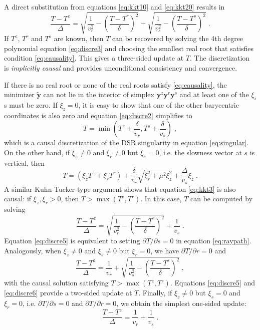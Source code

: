 A direct substitution from equations \ref{eq:kkt10} and \ref{eq:kkt20} results in 
\begin{equation}
\label{eq:discre3}
\frac{T-T^z}{\Delta} = 
\sqrt{\frac{1}{v_r^2} - \left( \frac{T-T^r}{\delta} \right)^2} + 
\sqrt{\frac{1}{v_s^2} - \left( \frac{T-T^s}{\delta} \right)^2}\;.
\end{equation}
If $T^z$, $T^r$ and $T^s$ are known, then $T$ can be recovered by solving the 4th degree polynomial equation 
\ref{eq:discre3} and choosing the smallest real root that satisfies condition \ref{eq:causality}. This gives a 
three-sided update at $T$. The discretization is \textit{implicitly causal} and provides unconditional 
consistency and convergence. 

If there is no real root or none of the real roots satisfy \ref{eq:causality}, the minimizer $\mathbf{\tilde{y}}$ 
can not lie in the interior of simplex $\mathbf{y}^z \mathbf{y}^r \mathbf{y}^s$ and at least one of the $\xi_i$s 
must be zero. If $\xi_z = 0$, it is easy to show that one of the other barycentric coordinates is also zero and 
equation \ref{eq:discre2} simplifies to 
\begin{equation}
\label{eq:discre4}
T = \min \left( T^r + \frac{\delta}{v_r}, T^s + \frac{\delta}{v_s} \right)\;,
\end{equation}
which is a causal discretization of the DSR singularity in equation \ref{eq:singular}. On the other hand, if 
$\xi_z \not= 0$ and $\xi_r \not= 0$ but $\xi_s = 0$, i.e. the slowness vector at $s$ is vertical, then
\begin{equation}
\label{eq:kkt3}
T = (\xi_z T^z + \xi_r T^r) + \frac{\delta}{v_r} \sqrt{\xi_r^2 + \mu^2 \xi_z^2} 
+ \frac{\Delta}{v_s} \xi_z\;.
\end{equation}
A similar Kuhn-Tucker-type argument shows that equation \ref{eq:kkt3} is also causal: if $\xi_z,\xi_r > 0$, then 
$T > \max(T^z,T^r)$. In this case, $T$ can be computed by solving 
\begin{equation}
\label{eq:discre5}
\frac{T-T^z}{\Delta} = 
\sqrt{\frac{1}{v_r^2} - \left( \frac{T-T^r}{\delta} \right)^2} + \frac{1}{v_s}\;.
\end{equation}
Equation \ref{eq:discre5} is equivalent to setting $\partial T / \partial s = 0$ in equation \ref{eq:raypath}. 
Analogously, when $\xi_z \not= 0$ and $\xi_s \not= 0$ but $\xi_r = 0$, we have $\partial T / \partial r = 0$ and
\begin{equation}
\label{eq:discre6}
\frac{T-T^z}{\Delta} = 
\frac{1}{v_r} + \sqrt{\frac{1}{v_s^2} - \left( \frac{T-T^s}{\delta} \right)^2}\;,
\end{equation}
with the causal solution satisfying $T > \max(T^z,T^s)$. Equations \ref{eq:discre5} and \ref{eq:discre6} provide 
a two-sided update at $T$. Finally, if $\xi_z \not= 0$ but $\xi_s = 0$ and $\xi_r = 0$, i.e. 
$\partial T / \partial s = 0$ and $\partial T / \partial r = 0$, we obtain the simplest one-sided update:
\begin{equation}
\label{eq:discre7}
\frac{T-T^z}{\Delta} = 
\frac{1}{v_r} + \frac{1}{v_s}\;.
\end{equation}

